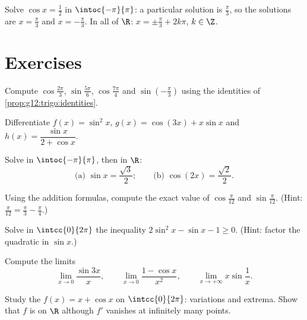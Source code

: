 \begin{example}\label{ex:g12:trigo:equation}
Solve $\cos x = \frac12$ in $\intoc{-\pi}{\pi}$: a particular solution is
$\frac\pi3$, so the solutions are $x = \frac\pi3$ and $x = -\frac\pi3$.
In all of $\R$: $x = \pm\frac\pi3 + 2k\pi$, $k \in \Z$.
\end{example}

\section{Exercises}

\begin{exercise}[$\star$]\label{exo:g12:trigo:1}
Compute $\cos\frac{2\pi}{3}$, $\sin\frac{5\pi}{6}$, $\cos\frac{7\pi}{4}$ and
$\sin\left(-\frac{\pi}{3}\right)$ using the identities of
\cref{prop:g12:trigo:identities}.
\end{exercise}

\begin{exercise}[$\star$]\label{exo:g12:trigo:2}
Differentiate $f(x) = \sin^2 x$, $g(x) = \cos(3x) + x\sin x$ and
$h(x) = \dfrac{\sin x}{2 + \cos x}$.
\end{exercise}

\begin{exercise}[$\star$]\label{exo:g12:trigo:3}
Solve in $\intoc{-\pi}{\pi}$, then in $\R$:
\[
\text{(a) } \sin x = \frac{\sqrt3}{2};
\qquad
\text{(b) } \cos\left(2x\right) = \frac{\sqrt2}{2} .
\]
\end{exercise}

\begin{exercise}[$\star\star$]\label{exo:g12:trigo:4}
Using the addition formulas, compute the exact value of
$\cos\frac{\pi}{12}$ and $\sin\frac{\pi}{12}$.
(Hint: $\frac{\pi}{12} = \frac{\pi}{3} - \frac{\pi}{4}$.)
\end{exercise}

\begin{exercise}[$\star\star$]\label{exo:g12:trigo:5}
Solve in $\intcc{0}{2\pi}$ the inequality $2\sin^2 x - \sin x - 1 \geq 0$.
(Hint: factor the quadratic in $\sin x$.)
\end{exercise}

\begin{exercise}[$\star\star$]\label{exo:g12:trigo:6}
Compute the limits
\[
\lim_{x\to0} \frac{\sin 3x}{x}, \qquad
\lim_{x\to0} \frac{1 - \cos x}{x^2}, \qquad
\lim_{x\to+\infty} x \sin\frac{1}{x}.
\]
\end{exercise}

\begin{exercise}[$\star\star$]\label{exo:g12:trigo:7}
Study the  $f(x) = x + \cos x$ on $\intcc{0}{2\pi}$: variations and
extrema. Show that $f$ is  on $\R$ although $f'$ vanishes at
infinitely many points.
\end{exercise}

